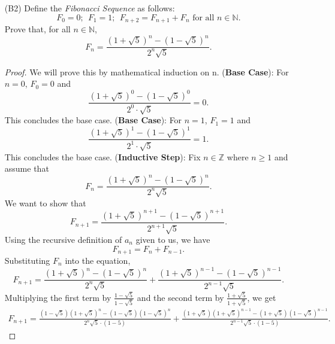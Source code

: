 \documentclass{article}
\begin{document}
\begin{itemize}
    	\item [(B2)] Define the \emph{Fibonacci Sequence} as follows:
    		\[
    			F_0 = 0; \ \ F_1 = 1; \ \ F_{n+2} = F_{n+1} + F_n \text{ for all } n \in \mathbb{N}.
    		\]
    		Prove that, for all $n \in \mathbb{N}$,
    		\[
    			F_n = \frac{ \left( 1+\sqrt{5} \right)^n - \left( 1-\sqrt{5} \right)^n }{ 2^n \sqrt{5} }.
    		\]
                \begin{proof}
                    We will prove this by mathematical induction on n.
                    \ppar (\textbf{Base Case}): For $n = 0$, $F_0 = 0$ and 
                        \[
                            \frac{(1 + \sqrt{5})^{0} - (1 - \sqrt{5})^{0}}{2^0 \cdot \sqrt{5}} = 0. 
                        \]
                    This concludes the base case.
                    \ppar (\textbf{Base Case}): For $n = 1$, $F_1 = 1$ and 
                        \[
                            \frac{(1 + \sqrt{5})^{1} - (1 - \sqrt{5})^{1} }{2^1 \cdot \sqrt{5}} = 1. 
                        \]
                    This concludes the base case.
                    \ppar (\textbf{Inductive Step}): Fix $n\in\mathbb{Z}$ where $n \ge 1$ and assume that 
                        \[
    			             F_n = \frac{ \left( 1+\sqrt{5} \right)^n - \left( 1-\sqrt{5} \right)^n }{ 2^n \sqrt{5} }.
    		          \]
                    \ppar We want to show that
                        \[
    			             F_{n + 1} = \frac{ \left( 1+\sqrt{5} \right)^{n + 1} - \left( 1-\sqrt{5} \right)^{n + 1} }{ 2^{n + 1} \sqrt{5} }.
    		          \]
                    \ppar Using the recursive definition of $a_n$ given to us, we have
                        \[
    			             F_{n+1} = F_n + F_{n - 1}.
    		          \]
                    \ppar Substituting $F_n$ into the equation, 
                        \[
    			             F_{n + 1} = \frac{ \left( 1+\sqrt{5} \right)^n - \left( 1-\sqrt{5} \right)^n }{ 2^n \sqrt{5} } + \frac{ \left( 1+\sqrt{5} \right)^{n - 1} - \left( 1-\sqrt{5} \right)^{n - 1} }{ 2^{n - 1} \sqrt{5} }.
    		          \]
                    \ppar Multiplying the first term by $\frac{1 - \sqrt{5}}{1 - \sqrt{5}}$ and the second term by $\frac{1 + \sqrt{5}}{1 + \sqrt{5}}$, we get
                        \begin{align*}
                             F_{n + 1} = \frac{ (1 - \sqrt{5})\left( 1+\sqrt{5} \right)^n - (1 - \sqrt{5})\left( 1-\sqrt{5} \right)^n }{ 2^n \sqrt{5} \cdot (1 - 5)} + \frac{ (1 + \sqrt{5})\left( 1+\sqrt{5} \right)^{n - 1} - (1 + \sqrt{5})\left( 1-\sqrt{5} \right)^{n - 1} }{ 2^{n - 1} \sqrt{5} \cdot (1 - 5)}.

\end{align*}
\end{proof}
\end{itemize}
\end{document}

